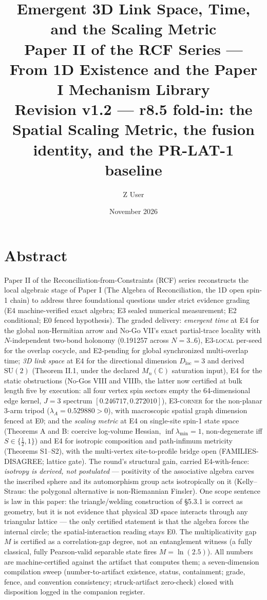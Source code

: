 \documentclass[11pt,a4paper]{article}
\title{Emergent 3D Link Space, Time, and the Scaling Metric\\
\large Paper II of the RCF Series --- From 1D Existence and the
Paper I Mechanism Library\\
\large \textmd{Revision v1.2 --- r8.5 fold-in: the Spatial Scaling
Metric, the fusion identity, and the PR-LAT-1 baseline}}
\author{Z User}
\date{November 2026}
\theoremstyle{definition}
\newcommand{\E}[1]{\textsc{E#1}}
\begin{document}
\setcounter{tocdepth}{2}
\tableofcontents
\newpage

\section*{Abstract}
\noindent
Paper II of the Reconciliation-from-Constraints (RCF) series
reconstructs the local algebraic stage of Paper I (The Algebra of
Reconciliation, the 1D open spin-1 chain) to address three
foundational questions under strict evidence grading
(\E4{} machine-verified exact algebra; \E3{} sealed numerical
measurement; \E2{} conditional; \E0{} fenced hypothesis). The graded
delivery: \emph{emergent time} at \E4{} for the global non-Hermitian
arrow and No-Go VII's exact partial-trace locality with
$N$-independent two-bond holonomy (0.191257 across $N{=}3..6$),
\E{3-local} per-seed for the overlap cocycle, and \E2{}-pending for
global synchronized multi-overlap time; \emph{3D link space} at
\E4{} for the directional dimension $D_{\mathrm{loc}}=3$ and derived
$\mathrm{SU}(2)$ (Theorem II.1, under the declared
$M_n(\mathbb{C})$ saturation input), \E4{} for the static obstructions
(No-Gos VIII and VIIIb, the latter now certified at bulk length five
by execution: all four vertex spin sectors empty the 64-dimensional
edge kernel, $J{=}3$ spectrum $[0.246717, 0.272010]$), \E{3-corner}
for the non-planar 3-arm tripod ($\lambda_A=0.529880>0$), with
macroscopic spatial graph dimension fenced at \E0{}; and the
\emph{scaling metric} at \E4{} on single-site spin-1 state space
(Theorems A and B: coercive log-volume Hessian,
$\inf\lambda_{\min}=1$, non-degenerate iff $S\in\{\tfrac12,1\}$) and
\E4{} for isotropic composition and path-infimum metricity
(Theorems S1--S2), with the multi-vertex site-to-profile bridge open
(\textsc{FAMILIES-DISAGREE}; lattice gate). The round's structural
gain, carried \E4{}-with-fence: \emph{isotropy is derived, not
postulated} --- positivity of the associative algebra carves the
inscribed sphere and its automorphism group acts isotropically on it
(Kelly--Straus: the polygonal alternative is non-Riemannian Finsler).
One scope sentence is law in this paper: the triangle/welding
construction of \S5.3.1 is correct as geometry, but it is not
evidence that physical 3D space interacts through any triangular
lattice --- the only certified statement is that the algebra forces
the internal circle; the spatial-interaction reading stays \E0{}.
The multiplicativity gap $M$ is certified as a correlation-gap
degree, not an entanglement witness (a fully classical,
fully Pearson-valid separable state fires $M=\ln(2.5)$). All numbers
are machine-certified against the artifact that computes them; a
seven-dimension compilation sweep (number-to-artifact existence,
status, containment; grade, fence, and convention consistency;
struck-artifact zero-check) closed with disposition logged in the
companion register.
\newpage
\end{document}
